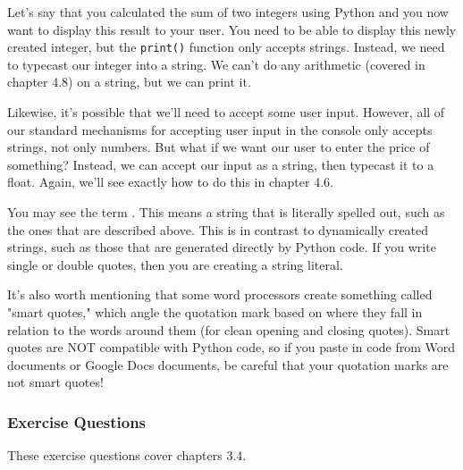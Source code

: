 Let's say that you calculated the sum of two integers using Python and you now want to display this result to your user. You need to be able to display this newly created integer, but the \verb|print()| function only accepts strings. Instead, we need to typecast our integer into a string. We can't do any arithmetic (covered in chapter 4.8) on a string, but we can print it.\par
Likewise, it's possible that we'll need to accept some user input. However, all of our standard mechanisms for accepting user input in the console only accepts strings, not only numbers. But what if we want our user to enter the price of something? Instead, we can accept our input as a string, then typecast it to a float. Again, we'll see exactly how to do this in chapter 4.6.\par
You may see the term . This means a string that is literally spelled out, such as the ones that are described above. This is in contrast to dynamically created strings, such as those that are generated directly by Python code. If you write single or double quotes, then you are creating a string literal.\par
It's also worth mentioning that some word processors create something called "smart quotes," which angle the quotation mark based on where they fall in relation to the words around them (for clean opening and closing quotes). Smart quotes are NOT compatible with Python code, so if you paste in code from Word documents or Google Docs documents, be careful that your quotation marks are not smart quotes!\par
\subsubsection*{Exercise Questions}
These exercise questions cover chapters 3.4. 
\begin{Exercise}
\end{Exercise}
\begin{Exercise}
\end{Exercise}